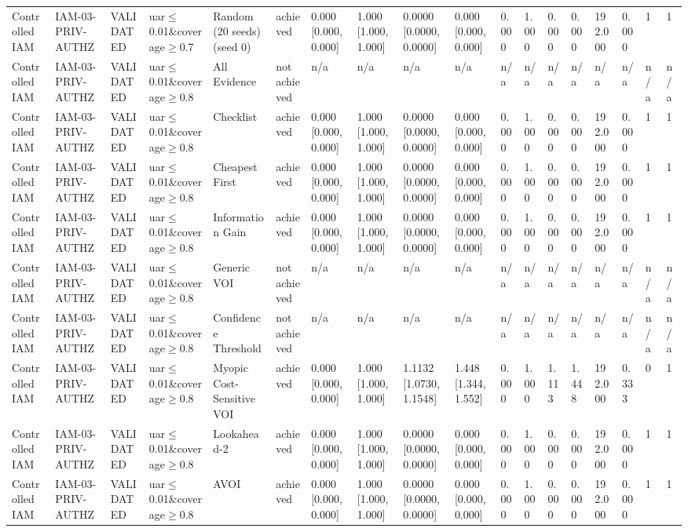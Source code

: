 \begin{table}[!ht]
{\begin{tabular}{llllllllllllllllll}
Controlled IAM & IAM-03-PRIV-AUTHZ & VALIDATED & uar$\le$0.01\&coverage$\ge$0.7 & Random (20 seeds) (seed 0) & achieved & 0.000 [0.000, 0.000] & 1.000 [1.000, 1.000] & 0.0000 [0.0000, 0.0000] & 0.000 [0.000, 0.000] & 0.000 & 1.000 & 0.000 & 0.000 & 192.000 & 0.000 & 1 & 1 \\
Controlled IAM & IAM-03-PRIV-AUTHZ & VALIDATED & uar$\le$0.01\&coverage$\ge$0.8 & All Evidence & not achieved & n/a & n/a & n/a & n/a & n/a & n/a & n/a & n/a & n/a & n/a & n/a & n/a \\
Controlled IAM & IAM-03-PRIV-AUTHZ & VALIDATED & uar$\le$0.01\&coverage$\ge$0.8 & Checklist & achieved & 0.000 [0.000, 0.000] & 1.000 [1.000, 1.000] & 0.0000 [0.0000, 0.0000] & 0.000 [0.000, 0.000] & 0.000 & 1.000 & 0.000 & 0.000 & 192.000 & 0.000 & 1 & 1 \\
Controlled IAM & IAM-03-PRIV-AUTHZ & VALIDATED & uar$\le$0.01\&coverage$\ge$0.8 & Cheapest First & achieved & 0.000 [0.000, 0.000] & 1.000 [1.000, 1.000] & 0.0000 [0.0000, 0.0000] & 0.000 [0.000, 0.000] & 0.000 & 1.000 & 0.000 & 0.000 & 192.000 & 0.000 & 1 & 1 \\
Controlled IAM & IAM-03-PRIV-AUTHZ & VALIDATED & uar$\le$0.01\&coverage$\ge$0.8 & Information Gain & achieved & 0.000 [0.000, 0.000] & 1.000 [1.000, 1.000] & 0.0000 [0.0000, 0.0000] & 0.000 [0.000, 0.000] & 0.000 & 1.000 & 0.000 & 0.000 & 192.000 & 0.000 & 1 & 1 \\
Controlled IAM & IAM-03-PRIV-AUTHZ & VALIDATED & uar$\le$0.01\&coverage$\ge$0.8 & Generic VOI & not achieved & n/a & n/a & n/a & n/a & n/a & n/a & n/a & n/a & n/a & n/a & n/a & n/a \\
Controlled IAM & IAM-03-PRIV-AUTHZ & VALIDATED & uar$\le$0.01\&coverage$\ge$0.8 & Confidence Threshold & not achieved & n/a & n/a & n/a & n/a & n/a & n/a & n/a & n/a & n/a & n/a & n/a & n/a \\
Controlled IAM & IAM-03-PRIV-AUTHZ & VALIDATED & uar$\le$0.01\&coverage$\ge$0.8 & Myopic Cost-Sensitive VOI & achieved & 0.000 [0.000, 0.000] & 1.000 [1.000, 1.000] & 1.1132 [1.0730, 1.1548] & 1.448 [1.344, 1.552] & 0.000 & 1.000 & 1.113 & 1.448 & 192.000 & 0.333 & 0 & 1 \\
Controlled IAM & IAM-03-PRIV-AUTHZ & VALIDATED & uar$\le$0.01\&coverage$\ge$0.8 & Lookahead-2 & achieved & 0.000 [0.000, 0.000] & 1.000 [1.000, 1.000] & 0.0000 [0.0000, 0.0000] & 0.000 [0.000, 0.000] & 0.000 & 1.000 & 0.000 & 0.000 & 192.000 & 0.000 & 1 & 1 \\
Controlled IAM & IAM-03-PRIV-AUTHZ & VALIDATED & uar$\le$0.01\&coverage$\ge$0.8 & AVOI & achieved & 0.000 [0.000, 0.000] & 1.000 [1.000, 1.000] & 0.0000 [0.0000, 0.0000] & 0.000 [0.000, 0.000] & 0.000 & 1.000 & 0.000 & 0.000 & 192.000 & 0.000 & 1 & 1 \\

\end{tabular}}
\end{table}
